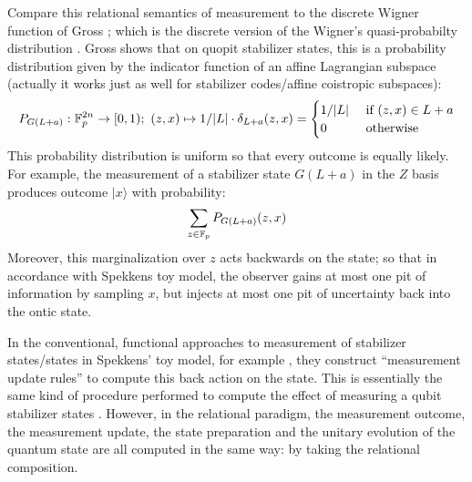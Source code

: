\begin{remark}
\label{rem:wig}
Compare this relational semantics of measurement to the discrete Wigner function of Gross \cite{gross}; which is the  discrete version of the Wigner's quasi-probabilty distribution \cite{Wigner1932}.  Gross shows that on quopit stabilizer states, this is a probability distribution given by the indicator function of an affine Lagrangian subspace  \cite[Lemma 9]{gross} (actually it works just as well for stabilizer codes/affine coistropic subspaces):
$$
P_{G(L+a)}:\mathbb{F}_p^{2n}\to [0,1);\ (z,x)\mapsto
1/|L| \cdot \delta_{L+a}(z,x)
=
\begin{cases}
1/|L| & \text{ if } (z,x) \in L+a\\
0 & \text{ otherwise}
\end{cases}
$$
This probability distribution is uniform so that every outcome is equally likely.  For example, the measurement of a stabilizer state $G(L+a)$ in the $Z$ basis produces outcome $|x\rangle$ with probability:
$$
\sum_{z\in \mathbb{F}_p} P_{G(L+a)}(z,x)
$$
Moreover, this marginalization over $z$ acts backwards on the state; so that in accordance with Spekkens toy model, the observer gains at most one pit of information by sampling $x$, but injects at most one pit of uncertainty back into the ontic state.


In the conventional, functional approaches to measurement of stabilizer states/states in Spekkens' toy model, for example \cite{catani}, they construct ``measurement update rules'' to compute this back action on the state.  This is essentially the same kind of procedure performed to compute the effect of  measuring a qubit stabilizer states \cite{aaronson}.  However, in the relational paradigm, the measurement outcome, the measurement update, the state preparation and the unitary evolution of the quantum state are all computed in the same way: by taking the relational composition.
\end{remark}
%
%
%



